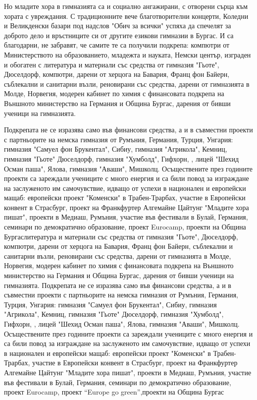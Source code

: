 Но младите хора в гимназията са и социално ангажирани, с отворени сърца към хората с увреждания. С традиционните вече благотворителни концерти, Коледни и Великденски базари под надслов "Обич за всички" успяха да спечелят за доброто дело и връстниците си от другите езикови гимназии в Бургас. И са благодарни, не забравят, че самите те са получили подкрепа: компютри от Министерството на образованието, младежта и науката, Немски център, изграден и обогатен с литература и материали със средства от гимназия "Гьоте", Дюселдорф, компютри, дарени от херцога на Бавария, Франц фон Байерн, съблекални и санитарни възли, реновирани със средства, дарени от гимназията в Молде, Норвегия, модерен кабинет по химия с финансовата подкрепа на Външното министерство на Германия и Община Бургас, дарения от бивши ученици на гимназията.

Подкрепата не се изразява само във финансови средства, а и в съвместни проекти с партньорите на немска гимназия от Румъния, Германия, Турция, Унгария: гимназия "Самуел фон Брукентал", Сибиу, гимназия "Агрикола", Кемниц, гимназия "Гьоте" Дюселдорф, гимназия "Хумболд", Гифхорн, , лицей "Шехид Осман паша", Ялова, гимназия "Аваши", Мишколц. Осъществените през годините проекти са зареждали учениците с много енергия и са били повод за изграждане на заслуженото им самочувствие, идващо от успехи в национален и европейски мащаб: европейски проект "Коменски" в Трабен-Трарбах, участие в Европейски конвент в Страсбург, проект на Франкфуртер Алгемайне Цайтунг "Младите хора пишат", проекти в Медиаш, Румъния, участие във фестивали в Булай, Германия, семинари по демократично образование, проект Eurocamp, проекти на Община Бургаслитература и материали със средства от гимназия "Гьоте", Дюселдорф, компютри, дарени от херцога на Бавария, Франц фон Байерн, съблекални и санитарни възли, реновирани със средства, дарени от гимназията в Молде, Норвегия, модерен кабинет по химия с финансовата подкрепа на Външното министерство на Германия и Община Бургас, дарения от бивши ученици на гимназията. Подкрепата не се изразява само във финансови средства, а и в съвместни проекти с партньорите на немска гимназия от Румъния, Германия, Турция, Унгария: гимназия "Самуел фон Брукентал", Сибиу, гимназия "Агрикола", Кемниц, гимназия "Гьоте" Дюселдорф, гимназия "Хумболд", Гифхорн, , лицей "Шехид Осман паша", Ялова, гимназия "Аваши", Мишколц. Осъществените през годините проекти са зареждали учениците с много енергия и са били повод за изграждане на заслуженото им самочувствие, идващо от успехи в национален и европейски мащаб: европейски проект "Коменски" в Трабен-Трарбах, участие в Европейски конвент в Страсбург, проект на Франкфуртер Алгемайне Цайтунг "Младите хора пишат", проекти в Медиаш, Румъния, участие във фестивали в Булай, Германия, семинари по демократично образование, проект Eurocamp, проект “Europe go green”,проекти на Община Бургас

